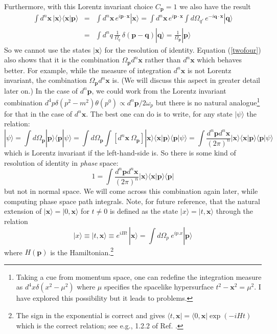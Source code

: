 \documentclass[12pt]{article}
\def\ket#1{|#1\rangle}                    %
\def\bra#1{\langle #1|}                   %
\def\amp#1#2{\langle #1 | #2\rangle}      %
\begin{document}
Furthermore, with this  Lorentz invariant choice $C_{\bm{p}}=1$ we also have the result
\begin{eqnarray}
 \int d^n \bm{x} \, \ket{\bm{x}}\amp{\bm{x}}{\bm{p}} &=& \int d^n \bm{x} \, e^{i\bm{p \cdot x}} \ket{\bm{x}}
 =\int d^n \bm{x} \,e^{i\bm{p \cdot x}}\int d\Omega_{q'} \, e^{-i\bm{q \cdot x}} \ket{\bm{q}}\nonumber\\
 &=& \int d^n {q} \,\frac{1}{\Omega_q}\, \delta(\bm{p}-\bm{q})\ket{\bm{q}} = \frac{1}{\Omega_{\bm{p}}} \ket{\bm{p}}
 \label{twofour}
\end{eqnarray} 
So we cannot use the states $\ket{\bm{x}}$ for the resolution of identity.  Equation (\ref{twofour}) also shows that it is the combination $\Omega_{\bm{p}}d^n \bm{x}$ rather than 
$d^n \bm{x}$ which behaves better. For example, while 
 the measure of integration $d^n \bm{x}$ is not Lorentz invariant, the combination  $\Omega_{\bm{p}}d^n \bm{x}$ is. (We will discuss this aspect in greater detail later on.) In the case of $d^n \bm{p}$, we could work from the Lorentz invariant combination $d^4p \delta(p^2-m^2) \theta(p^0)\propto d^n \bm{p}/2\omega_p$ but there is no natural analogue\footnote{Taking a cue from momentum space, one can redefine the integration measure as $d^4x \delta(x^2-\mu^2)$ where $\mu$ specifies the spacelike hypersurface $t^2-\mathbf{x}^2=\mu^2$. I have explored this possibility \cite{tpun}  but it leads to problems.} for that in the case of $d^n \bm{x}$.  The best one can do is to write, for any state $\ket{\psi}$ the  relation:
\begin{equation}
 \ket{\psi}=\int d\Omega_{\bm{p}}\ket{\bm{p}}\amp{\bm{p}}{\psi}=\int d\Omega_{\bm{p}}\int [d^n \bm{x}\ \Omega_{\bm{p}}]\ket{\bm{x}}\amp{\bm{x}}{\bm{p}}\amp{\bm{p}}{\psi}
 =\int \frac{d^n \bm{p} d^n \bm{x}}{(2\pi)^n}\ket{\bm{x}}\amp{\bm{x}}{\bm{p}}\amp{\bm{p}}{\psi}
 \label{measure2}
 \end{equation} 
 which is Lorentz invariant if the left-hand-side is. 
So there is some kind of resolution of identity in \textit{phase} space:
\begin{equation}
1=\int \frac{d^n \bm{p} d^n \bm{x}}{(2\pi)^n}\ket{\bm{x}}\amp{\bm{x}}{\bm{p}}\bra{\bm{p}}
 \end{equation}
 but not in normal space.
We will come across this combination again later, while computing phase space path integrals.
Note, for future reference, that the natural extension of $\ket{\bm{x}} = \ket{0,\bm{x}}$ for $t\neq 0$  is defined as the state $\ket{x} = \ket{t,\bm{x}}$ through  
the relation 
\begin{equation}
\ket{x} \equiv  \ket{t,\bm{x}}\equiv e^{i Ht} \,\ket{\bm{x}} = \int d\Omega_p \ e^{i{p . x}} \ket{\bm{p}}
\label{nintynine}
\end{equation} 
  where $H(\bm{p})$ is the Hamiltonian.\footnote{The sign in the exponential is correct and gives $\bra{t,\bm{x}}=\bra{0,\bm{x}}\exp(-iHt)$ which is the correct relation; see e.g., 1.2.2 of Ref. \cite{tpqft}.}
\end{document}
